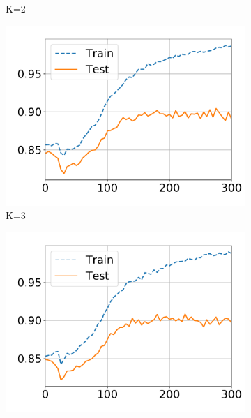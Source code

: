 \begin{figure}[!ht]
\begin{subfigure}{.33\textwidth}
    \vspace{-0.8cm}
    \caption{K=2}
  \end{subfigure}
  \centering
  \begin{subfigure}{.33\textwidth}
    \centering
    \includegraphics[width=1\linewidth]{images/supply/train_curves/satimage_3.pdf}
    \vspace{-0.8cm}
    \caption{K=3}
  \end{subfigure}
  \centering
  \begin{subfigure}{0.33\textwidth}
    \centering
    \includegraphics[width=1\linewidth]{images/supply/train_curves/satimage_4.pdf}

\end{subfigure}
\end{figure}
